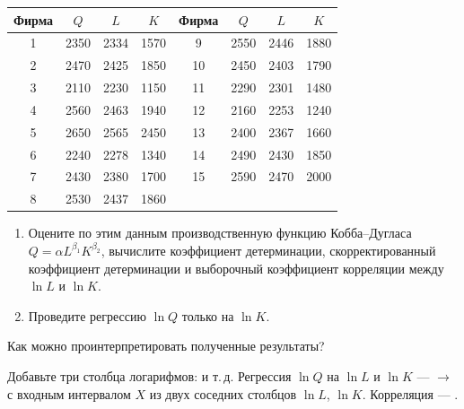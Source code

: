 \begin{center}
\begin{tabular}{cccc @{\qquad} cccc}
\toprule
Фирма & $Q$ & $L$ & $K$ & Фирма & $Q$ & $L$ & $K$ \\
\midrule
1 & 2350 & 2334 & 1570 &  9 & 2550 & 2446 & 1880 \\
2 & 2470 & 2425 & 1850 & 10 & 2450 & 2403 & 1790 \\
3 & 2110 & 2230 & 1150 & 11 & 2290 & 2301 & 1480 \\
4 & 2560 & 2463 & 1940 & 12 & 2160 & 2253 & 1240 \\
5 & 2650 & 2565 & 2450 & 13 & 2400 & 2367 & 1660 \\
6 & 2240 & 2278 & 1340 & 14 & 2490 & 2430 & 1850 \\
7 & 2430 & 2380 & 1700 & 15 & 2590 & 2470 & 2000 \\
8 & 2530 & 2437 & 1860 &    &      &      &      \\
\bottomrule
\end{tabular}
\end{center}

\begin{enumerate}[label=\asbuk*), leftmargin=2.2em, itemsep=3pt]
  \item Оцените по этим данным производственную функцию Кобба--Дугласа
        $Q = \alpha L^{\beta_1}K^{\beta_2}$, вычислите коэффициент детерминации,
        скорректированный коэффициент детерминации и выборочный коэффициент
        корреляции между $\ln L$ и $\ln K$.
  \item Проведите регрессию $\ln Q$ только на $\ln K$.
\end{enumerate}
Как можно проинтерпретировать полученные результаты?

\begin{excel}
Добавьте три столбца логарифмов:  и т.\,д. Регрессия
$\ln Q$ на $\ln L$ и $\ln K$ —  $\to$  с
входным интервалом $X$ из двух соседних столбцов $\ln L$, $\ln K$. Корреляция —
.
\end{excel}


